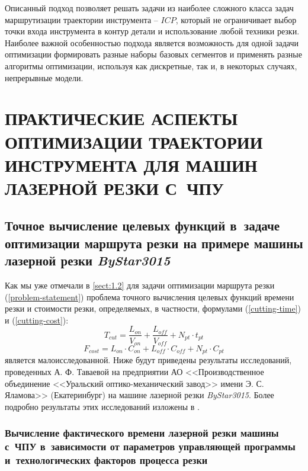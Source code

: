 \documentclass[11pt,twoside,openany]{report}
\newcounter{lem}
\begin{document}
Описанный подход позволяет решать задачи из
наиболее сложного класса задач маршрутизации
траектории инструмента -- $ICP$,
который не ограничивает выбор точки входа
инструмента в контур детали и использование
любой техники резки.
Наиболее важной особенностью подхода
является возможность для одной задачи оптимизации
формировать разные наборы базовых сегментов и
применять разные алгоритмы оптимизации,
используя как дискретные, так и,
в некоторых случаях, непрерывные модели.


\chapter{
  ПРАКТИЧЕСКИЕ АСПЕКТЫ ОПТИМИЗАЦИИ ТРАЕКТОРИИ ИНСТРУМЕНТА
  ДЛЯ МАШИН ЛАЗЕРНОЙ РЕЗКИ С~ЧПУ
}
\setcounter{chapter}{2}
\setcounter{equation}{0}

\section{
  Точное вычисление целевых функций
  в~задаче оптимизации маршрута резки
  на примере машины лазерной резки
  {\it ByStar3015}
}

Как мы уже  отмечали в \ref{sect:1.2}
для задачи оптимизации маршрута резки (\ref{problem-statement})
проблема точного вычисления целевых функций времени резки и стоимости резки,
определяемых, в частности, формулами (\ref{cutting-time}) и (\ref{cutting-cost}):
$$
T_{cut} = \frac{L_{on}}{V_{on}} + \frac{L_{off}}{V_{off}} +N_{pt} \cdot t_{pt}
$$
$$
F_{cost}=
L_{on} \cdot C_{on} +
L_{off} \cdot C_{off} +
N_{pt} \cdot C_{pt}
$$
является малоисследованной.
Ниже будут приведены результаты исследований,
проведенных А. Ф. Таваевой на предприятии
АО <<Производственное объединение <<Уральский оптико-механический завод>>
имени Э. С. Яламова>>
(Екатеринбург)
на машине лазерной резки
{\it ByStar3015}.
Более подробно результаты этих исследований изложены в
\cite{intro45,intro46,intro47}.

\subsection{
  Вычисление фактического времени лазерной резки
  машины с~ЧПУ
  в~зависимости от параметров управляющей программы
  и~технологических факторов процесса резки
}
\end{document}
